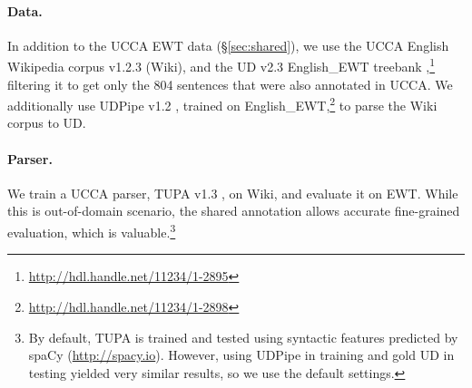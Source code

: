 \documentclass[11pt,a4paper]{article}
\begin{document}
\paragraph{Data.}

In addition to the UCCA EWT data (\S\ref{sec:shared}),
we use the UCCA English Wikipedia corpus v1.2.3 (Wiki),
and the UD v2.3 English\_EWT treebank
\cite{11234/1-2895},\footnote{\url{http://hdl.handle.net/11234/1-2895}}
filtering it to get only the 804 sentences that were also annotated in UCCA.
We additionally use UDPipe v1.2 \cite{udpipe,udpipe:2017},
trained on
English\_EWT,\footnote{\url{http://hdl.handle.net/11234/1-2898}}
to parse the Wiki corpus to UD.

\paragraph{Parser.}

We train a UCCA parser,
TUPA v1.3 \cite{hershcovich2017a,hershcovich2018multitask},
on Wiki, and evaluate it on EWT.
While this is out-of-domain scenario,
the shared annotation allows accurate fine-grained evaluation, which is
valuable.\footnote{By default, TUPA is trained and tested using syntactic features
predicted by spaCy (\url{http://spacy.io}).
However, using UDPipe in training and gold UD in testing yielded very similar
results, so we use the default settings.}

%
\end{document}
